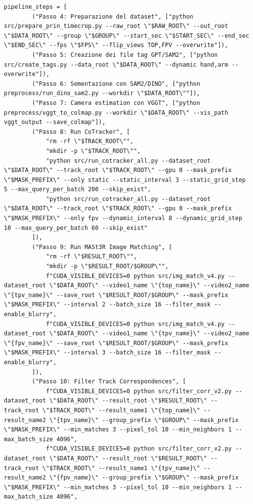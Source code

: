 \begin{lstlisting}[style=pythonstyle, caption={Definizione della pipeline di elaborazione}, label={lst:pipeline_steps}]
pipeline_steps = [
        ("Passo 4: Preparazione del dataset", ["python src/prepare_prin_timecrop.py --raw_root \"$RAW_ROOT\" --out_root \"$DATA_ROOT\" --group \"$GROUP\" --start_sec \"$START_SEC\" --end_sec \"$END_SEC\" --fps \"$FPS\" --flip_views TOP,FPV --overwrite"]),
        ("Passo 5: Creazione dei file tag GPT/SAM2", ["python src/create_tags.py --data_root \"$DATA_ROOT\" --dynamic hand,arm --overwrite"]),
        ("Passo 6: Sementazione con SAM2/DINO", ["python preprocess/run_dino_sam2.py --workdir \"$DATA_ROOT\""]),
        ("Passo 7: Camera estimation con VGGT", ["python preprocess/vggt_to_colmap.py --workdir \"$DATA_ROOT\" --vis_path vggt_output --save_colmap"]),
        ("Passo 8: Run CoTracker", [
            "rm -rf \"$TRACK_ROOT\"",
            "mkdir -p \"$TRACK_ROOT\"",
            "python src/run_cotracker_all.py --dataset_root \"$DATA_ROOT\" --track_root \"$TRACK_ROOT\" --gpu 0 --mask_prefix \"$MASK_PREFIX\" --only static --static_interval 3 --static_grid_step 5 --max_query_per_batch 200 --skip_exist",
            "python src/run_cotracker_all.py --dataset_root \"$DATA_ROOT\" --track_root \"$TRACK_ROOT\" --gpu 0 --mask_prefix \"$MASK_PREFIX\" --only fpv --dynamic_interval 8 --dynamic_grid_step 10 --max_query_per_batch 60 --skip_exist"
        ]),
        ("Passo 9: Run MASt3R Image Matching", [
            "rm -rf \"$RESULT_ROOT\"",
            "mkdir -p \"$RESULT_ROOT/$GROUP\"",
            f"CUDA_VISIBLE_DEVICES=0 python src/img_match_v4.py --dataset_root \"$DATA_ROOT\" --video1_name \"{top_name}\" --video2_name \"{tpv_name}\" --save_root \"$RESULT_ROOT/$GROUP\" --mask_prefix \"$MASK_PREFIX\" --interval 2 --batch_size 16 --filter_mask --enable_blurry",
            f"CUDA_VISIBLE_DEVICES=0 python src/img_match_v4.py --dataset_root \"$DATA_ROOT\" --video1_name \"{tpv_name}\" --video2_name \"{fpv_name}\" --save_root \"$RESULT_ROOT/$GROUP\" --mask_prefix \"$MASK_PREFIX\" --interval 3 --batch_size 16 --filter_mask --enable_blurry",
        ]),
        ("Passo 10: Filter Track Correspondences", [
            f"CUDA_VISIBLE_DEVICES=0 python src/filter_corr_v2.py --dataset_root \"$DATA_ROOT\" --result_root \"$RESULT_ROOT\" --track_root \"$TRACK_ROOT\" --result_name1 \"{top_name}\" --result_name2 \"{tpv_name}\" --group_prefix \"$GROUP\" --mask_prefix \"$MASK_PREFIX\" --min_matches 3 --pixel_tol 10 --min_neighbors 1 --max_batch_size 4096",
            f"CUDA_VISIBLE_DEVICES=0 python src/filter_corr_v2.py --dataset_root \"$DATA_ROOT\" --result_root \"$RESULT_ROOT\" --track_root \"$TRACK_ROOT\" --result_name1 \"{tpv_name}\" --result_name2 \"{fpv_name}\" --group_prefix \"$GROUP\" --mask_prefix \"$MASK_PREFIX\" --min_matches 3 --pixel_tol 10 --min_neighbors 1 --max_batch_size 4096",

\end{lstlisting}
